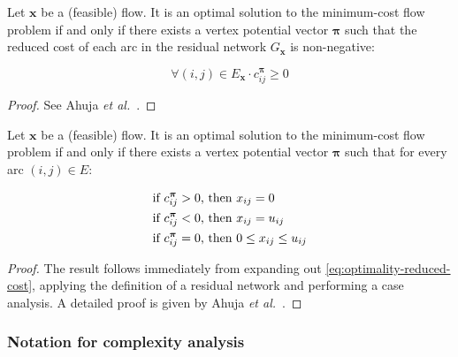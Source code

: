 \begin{thm} \label{thm:optimality-reduced-cost}
Let $\mathbf{x}$ be a (feasible) flow. It is an optimal solution to the minimum-cost flow problem if and only if there exists a vertex potential vector $\boldsymbol{\pi}$ such that the reduced cost of each arc in the residual network $G_{\mathbf{x}}$ is non-negative:

\begin{equation} \label{eq:optimality-reduced-cost}
\forall(i,j)\in E_{\mathbf{x}}\cdot c_{ij}^{\boldsymbol{\pi}}\geq 0
\end{equation}
\end{thm}
\begin{proof}
See Ahuja \textit{et al.}~\cite[p.~309]{Ahuja:1993}.
\end{proof}

\begin{thm} \label{thm:optimality-complementary-slackness}
Let $\mathbf{x}$ be a (feasible) flow. It is an optimal solution to the minimum-cost flow problem if and only if there exists a vertex potential vector $\boldsymbol{\pi}$ such that for every arc $(i,j)\in E$:

\normalfont %
\begin{subequations} \label{eq:optimality-complementary-slackness}
\begin{align} 
\text{if \ensuremath{c_{ij}^{\boldsymbol{\pi}}>0}, } & \text{then \ensuremath{x_{ij}=0}} \\
\text{if \ensuremath{c_{ij}^{\boldsymbol{\pi}}<0}, } & \text{then \ensuremath{x_{ij}=u_{ij}}} \\
\text{if \ensuremath{c_{ij}^{\boldsymbol{\pi}}=0}, } & \text{then \ensuremath{0\leq x_{ij}\leq  u_{ij}}}
\end{align}
\end{subequations}
\end{thm}
\begin{proof}
The result follows immediately from expanding out \cref{eq:optimality-reduced-cost}, applying the definition of a residual network and performing a case analysis. A detailed proof is given by Ahuja \textit{et al.}~\cite[p.~310]{Ahuja:1993}.
\end{proof}

\subsubsection{Notation for complexity analysis} \label{sec:prep-flow-complexity}

